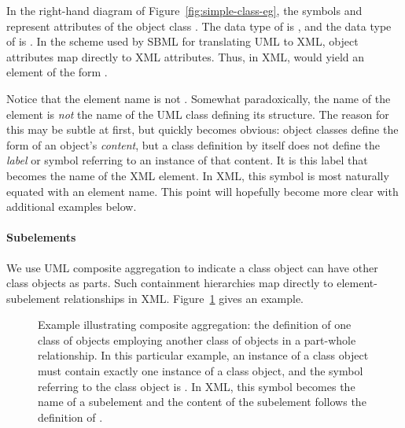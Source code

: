 In the right-hand diagram of Figure~\ref{fig:simple-class-eg}, the
symbols  and  represent
attributes of the object class .  The data
type of  is , and the data type of
 is .  In the scheme used
by SBML for translating UML to XML, object attributes map directly
to XML attributes.  Thus, in XML,  would yield
an element of the form .

Notice that the element name is not .
Somewhat paradoxically, the name of the element is \emph{not} the
name of the UML class defining its structure.  The reason for this
may be subtle at first, but quickly becomes obvious: object
classes define the form of an object's \emph{content}, but a class
definition by itself does not define the \emph{label} or symbol
referring to an instance of that content.  It is this label that
becomes the name of the XML element.  In XML, this symbol is most
naturally equated with an element name.  This point will hopefully
become more clear with additional examples below.


\paragraph{Subelements}

We use UML composite aggregation to indicate a class object can
have other class objects as parts.  Such containment hierarchies
map directly to element-subelement relationships in XML.
Figure~\ref{fig:subelement-eg} gives an example.

\begin{figure}[htb]
  \centering
  \small
  \caption{Example illustrating composite
      aggregation: the definition of one class of objects
      employing another class of objects in a part-whole
      relationship.  In this particular example, an instance of a
       class object must contain exactly one instance
      of a  class object, and the symbol referring to
      the  class object is .  In XML,
      this symbol becomes the name of a subelement and the content
      of the subelement follows the definition of .}
  \label{fig:subelement-eg}
\end{figure}

